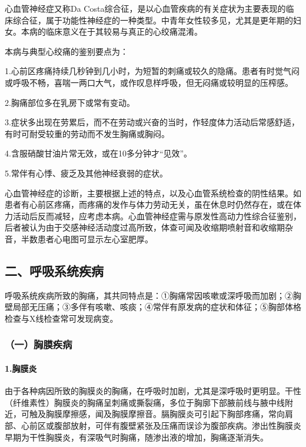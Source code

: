 心血管神经症又称Da
Costa综合征，是以心血管疾病的有关症状为主要表现的临床综合征，属于功能性神经症的一种类型。中青年女性较多见，尤其是更年期的妇女。本病的临床意义在于其较易与真正的心绞痛混淆。

本病与典型心绞痛的鉴别要点为：

1.心前区疼痛持续几秒钟到几小时，为短暂的刺痛或较久的隐痛。患者有时觉气闷或呼吸不畅，喜喘一两口大气，或作叹息样呼吸，但无闷痛或较明显的压榨感。

2.胸痛部位多在乳房下或常有变动。

3.症状多出现在劳累后，而不在劳动或兴奋的当时，作轻度体力活动后常感舒适，有时可耐受较重的劳动而不发生胸痛或胸闷。

4.含服硝酸甘油片常无效，或在10多分钟才“见效”。

5.常伴有心悸、疲乏及其他神经衰弱的症状。

心血管神经症的诊断，主要根据上述的特点，以及心血管系统检查的阴性结果。如患者有心前区疼痛，而疼痛的发作与体力劳动无关，虽在休息时仍然存在，或在体力活动后反而减轻，应考虑本病。心血管神经症需与原发性高动力性综合征鉴别，后者被认为由于交感神经活动度过高所致，体查可闻及收缩期喷射音和收缩期杂音，半数患者心电图可显示左心室肥厚。

\protect\hypertarget{text00095.html}{}{}

\subsection{二、呼吸系统疾病}

呼吸系统疾病所致的胸痛，其共同特点是：①胸痛常因咳嗽或深呼吸而加剧；②胸壁局部无压痛；③多伴有咳嗽、咳痰；④常伴有原发病的症状和体征；⑤胸部体格检查与X线检查常可发现病变。

\subsubsection{（一）胸膜疾病}

\paragraph{1.胸膜炎}

由于各种病因所致的胸膜炎的胸痛，在呼吸时加剧，尤其是深呼吸时更明显。干性（纤维素性）胸膜炎的胸痛呈刺痛或撕裂痛，多位于胸廓下部腋前线与腋中线附近，可触及胸膜摩擦感，闻及胸膜摩擦音。膈胸膜炎可引起下胸部疼痛，常向肩部、心前区或腹部放射，可伴有腹壁紧张及压痛而误诊为腹部疾病。渗出性胸膜炎早期为干性胸膜炎，有深吸气时胸痛，随渗出液的增加，胸痛逐渐消失。

